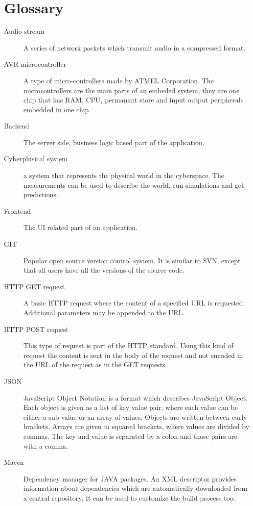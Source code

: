 \section{Glossary}
\begin{description}
	\item[Audio stream] A series of network packets which transmit audio in a compressed format.
	
	\item[AVR microcontroller] A type of micro-controllers made by ATMEL Corporation. The microcontrollers are the main parts of an embeded system, they are one chip that has RAM, CPU, permanant store and input output peripherals embedded in one chip.
	
	\item[Backend] The server side, business logic based part of the application.
	
	\item[Cyberphisical system] a system that represents the physical world in the cyberspace. The measurements can be used to describe the world, run simulations and get predictions.
	
	\item[Frontend] The UI related part of an application.
	
	\item[GIT] Popular open source version control system. It is similar to SVN, except that all users have all the versions of the source code.
	
	\item[HTTP GET request] A basic HTTP request where the content of a specified URL is requested. Additional parameters may be appended to the URL.
	
	\item[HTTP POST request] This type of request is part of the HTTP standard. Using this kind of request the content is sent in the body of the request and not encoded in the URL of the request as in the GET requests.
	
	\item[JSON] JavaScript Object Notation is a format which describes JavaScript Object. Each object is given as a list of key value pair, where each value can be either a sub value or an array of values. Objects are written between curly brackets. Arrays are given in squared brackets, where values are divided by commas. The key and value is separated by a colon and those pairs are with a comma.
	
	\item[Maven] Dependency manager for JAVA packages. An XML descriptor provides information about dependencies which are automatically downloaded from a central repository. It can be used to customize the build process too.
	

\end{description}
